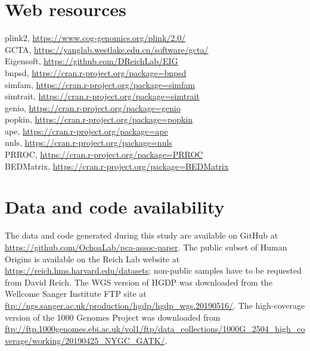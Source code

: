 \documentclass[9pt,lineno]{elife}
\begin{document}
\section{Web resources}
plink2, \url{https://www.cog-genomics.org/plink/2.0/}\\
GCTA, \url{https://yanglab.westlake.edu.cn/software/gcta/}\\
Eigensoft, \url{https://github.com/DReichLab/EIG}\\
bnpsd, \url{https://cran.r-project.org/package=bnpsd}\\
simfam, \url{https://cran.r-project.org/package=simfam}\\
simtrait, \url{https://cran.r-project.org/package=simtrait}\\
genio, \url{https://cran.r-project.org/package=genio}\\
popkin, \url{https://cran.r-project.org/package=popkin}\\
ape, \url{https://cran.r-project.org/package=ape}\\
nnls, \url{https://cran.r-project.org/package=nnls}\\
PRROC, \url{https://cran.r-project.org/package=PRROC}\\
BEDMatrix, \url{https://cran.r-project.org/package=BEDMatrix}

\section{Data and code availability}
The data and code generated during this study are available on GitHub at \url{https://github.com/OchoaLab/pca-assoc-paper}.
The public subset of Human Origins is available on the Reich Lab website at \url{https://reich.hms.harvard.edu/datasets}; non-public samples have to be requested from David Reich.
The WGS version of HGDP was downloaded from the Wellcome Sanger Institute FTP site at \url{ftp://ngs.sanger.ac.uk/production/hgdp/hgdp_wgs.20190516/}.
The high-coverage version of the 1000 Genomes Project was downloaded from \url{ftp://ftp.1000genomes.ebi.ac.uk/vol1/ftp/data_collections/1000G_2504_high_coverage/working/20190425_NYGC_GATK/}.



\end{document}
